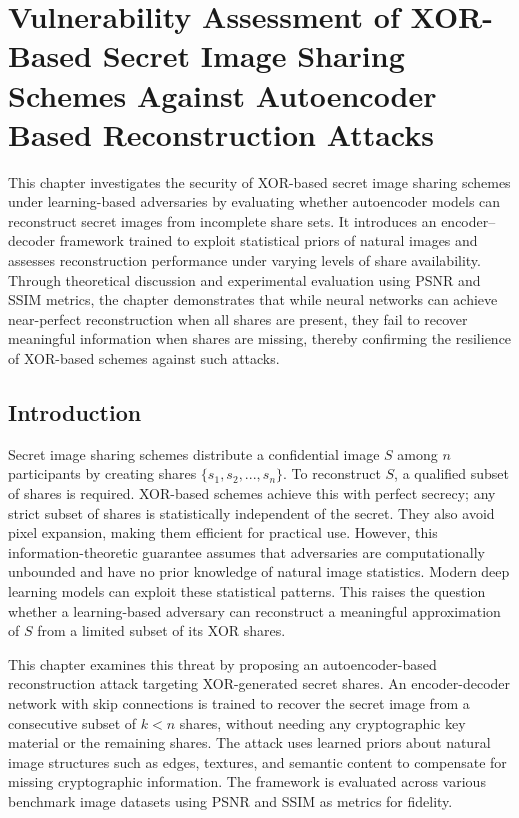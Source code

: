 \chapter{Vulnerability Assessment of XOR-Based Secret Image Sharing Schemes Against Autoencoder Based Reconstruction Attacks}

This chapter investigates the security of XOR-based secret image sharing schemes under learning-based adversaries by evaluating whether autoencoder models can reconstruct secret images from incomplete share sets. It introduces an encoder–decoder framework trained to exploit statistical priors of natural images and assesses reconstruction performance under varying levels of share availability. Through theoretical discussion and experimental evaluation using PSNR and SSIM metrics, the chapter demonstrates that while neural networks can achieve near-perfect reconstruction when all shares are present, they fail to recover meaningful information when shares are missing, thereby confirming the resilience of XOR-based schemes against such attacks.

\section{Introduction}

Secret image sharing schemes distribute a confidential image $S$ among $n$ participants by creating shares $\{s_1, s_2, ..., s_n\}$. To reconstruct $S$, a qualified subset of shares is required. XOR-based schemes achieve this with perfect secrecy; any strict subset of shares is statistically independent of the secret. They also avoid pixel expansion, making them efficient for practical use. However, this information-theoretic guarantee assumes that adversaries are computationally unbounded and have no prior knowledge of natural image statistics. Modern deep learning models can exploit these statistical patterns. This raises the question whether a learning-based adversary can reconstruct a meaningful approximation of $S$ from a limited subset of its XOR shares.

This chapter examines this threat by proposing an autoencoder-based reconstruction attack targeting XOR-generated secret shares. An encoder-decoder network with skip connections is trained to recover the secret image from a consecutive subset of $k < n$ shares, without needing any cryptographic key material or the remaining shares. The attack uses learned priors about natural image structures such as edges, textures, and semantic content to compensate for missing cryptographic information. The framework is evaluated across various benchmark image datasets using PSNR and SSIM as metrics for fidelity.

